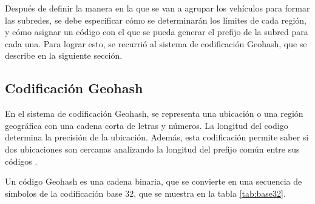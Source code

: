Después de definir la manera en la que se van a agrupar los vehículos para
formar las subredes, se debe especificar cómo se determinarán los límites de
cada región, y cómo asignar un código con el que se pueda generar el prefijo de
la subred para cada una. Para lograr esto, se recurrió al sistema de
codificación Geohash, que se describe en la siguiente sección.

\subsection{Codificación Geohash}

\label{subsec:codificacion_geohash}

En el sistema de codificación Geohash, se representa una ubicación o una
región geográfica con una cadena corta de letras y números. La longitud del
codigo determina la precisión de la ubicación. Además, esta codificación permite
saber si dos ubicaciones son cercanas analizando la longitud del prefijo común
entre sus códigos \cite{wiki:Geohash}.

Un código Geohash es una cadena binaria, que se convierte en una secuencia de
símbolos de la codificación base 32, que se muestra en la tabla
\ref{tab:base32}.

